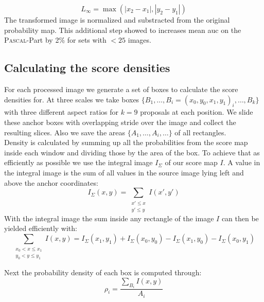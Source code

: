 \begin{equation}
    L_\infty = \max(|x_2 - x_1|, |y_2 - y_1|)
\end{equation}
The transformed image is normalized and substracted from the original probability map. This additional step showed to increases mean \gls{auc} on the \textsc{Pascal}-Part by 2\% for sets with $< 25$ images.

\clearpage
\subsection{Calculating the score densities}
\label{sec:pipeline:eval:density}
For each processed image we generate a set of boxes to calculate the score densities for. At three scales we take boxes $\{B_1,\dotsc, B_i = (x_0, y_0, x_1, y_1)_i,\dotsc, B_k\}$ with three different aspect ratios for $k=9$ \citep{ren_faster_2015} proposals at each position. We slide these anchor boxes  with overlapping stride over the image and collect the resulting slices. Also we save the areas $\{A_1,\dotsc, A_i,\dotsc\}$ of all rectangles.\\
Density is calculated by summing up all the probabilities from the score map inside each window and dividing those by the area of the box. To achieve that as efficiently as possible we use the integral image $I_\Sigma$ of our score map $I$. A value in the integral image is the sum of all values in the source image lying left and above the anchor coordinates:
\begin{equation}
    I_\Sigma(x, y) = \sum_{\substack{x' \le x\\ y' \le y}} I(x', y')
\end{equation}
With the integral image the sum inside any rectangle of the image $I$ can then be yielded efficiently with:
\begin{equation}
    \sum_{\substack{x_0 < x \le x_1\\ y_0 < y \le y_1}}I(x,y) = I_\Sigma(x_1, y_1) + I_\Sigma(x_0, y_0) - I_\Sigma(x_1, y_0) - I_\Sigma(x_0, y_1)
\end{equation}

Next the probability density of each box is computed through:
\begin{equation}
    \rho_i = \frac{\sum_{B_i}I(x,y)}{A_i}
\end{equation}

\clearpage
